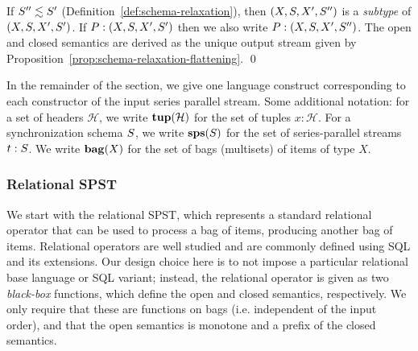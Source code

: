 \begin{definition}
\label{def:spst-subtyping}
If $\ss'' \lesssim \ss'$ (Definition~\ref{def:schema-relaxation}),
then $(X, \ss, X', \ss'')$ is a \emph{subtype} of $(X, \ss, X', \ss')$.
If $P: (X, \ss, X', \ss')$
then we also write $P: (X, \ss, X', \ss'')$.
The open and closed semantics are derived as the unique output stream
given by Proposition~\ref{prop:schema-relaxation-flattening}.
\qed
\end{definition}

\noindent
In the remainder of the section,
we give one language construct corresponding to each constructor of the input series parallel stream.
Some additional notation:
for a set of headers $\mathcal{H}$,
we write $\tup(\mathcal{H})$ for the set of tuples $x: \mathcal{H}$.
For a synchronization schema $\ss$,
we write $\sps(\ss)$ for the set of series-parallel streams $t: \ss$.
We write $\bag(X)$ for the set of bags (multisets) of items of type $X$.


\subsubsection{Relational SPST}

We start with the relational SPST, which represents a standard relational operator that can be used to process a bag of items, producing another bag of items.
Relational operators are well studied and are commonly defined using SQL
and its extensions.
Our design choice here is to not impose a particular relational base language
or SQL variant;
instead,
the relational operator is given as two \emph{black-box} functions,
which define the open and closed semantics,
respectively.
We only require that these are functions on bags (i.e. independent of the input order),
and that the open semantics is monotone and a prefix
of the closed semantics.

